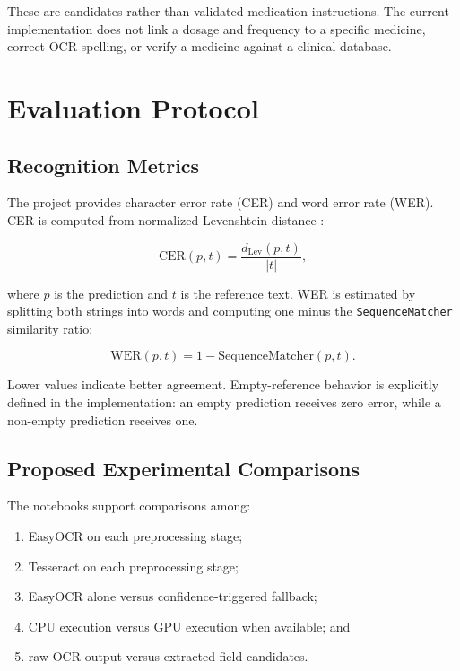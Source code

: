 \documentclass[conference]{IEEEtran}
\begin{document}
These are candidates rather than validated medication instructions. The
current implementation does not link a dosage and frequency to a specific
medicine, correct OCR spelling, or verify a medicine against a clinical
database.

\section{Evaluation Protocol}
\label{sec:evaluation}

\subsection{Recognition Metrics}

The project provides character error rate (CER) and word error rate (WER).
CER is computed from normalized Levenshtein distance \cite{levenshtein}:

\begin{equation}
\mathrm{CER}(p,t)=\frac{d_{\mathrm{Lev}}(p,t)}{|t|},
\label{eq:cer}
\end{equation}

where $p$ is the prediction and $t$ is the reference text. WER is estimated
by splitting both strings into words and computing one minus the
\texttt{SequenceMatcher} similarity ratio:

\begin{equation}
\mathrm{WER}(p,t)=1-\mathrm{SequenceMatcher}(p,t).
\label{eq:wer}
\end{equation}

Lower values indicate better agreement. Empty-reference behavior is explicitly
defined in the implementation: an empty prediction receives zero error, while
a non-empty prediction receives one.

\subsection{Proposed Experimental Comparisons}

The notebooks support comparisons among:

\begin{enumerate}
    \item EasyOCR on each preprocessing stage;
    \item Tesseract on each preprocessing stage;
    \item EasyOCR alone versus confidence-triggered fallback;
    \item CPU execution versus GPU execution when available; and
    \item raw OCR output versus extracted field candidates.
\end{enumerate}
\end{document}
